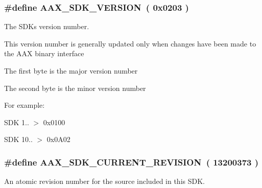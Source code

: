 \subsubsection[{A\+A\+X\+\_\+\+S\+D\+K\+\_\+\+V\+E\+R\+S\+I\+O\+N}]{\setlength{\rightskip}{0pt plus 5cm}\#define A\+A\+X\+\_\+\+S\+D\+K\+\_\+\+V\+E\+R\+S\+I\+O\+N~( 0x0203 )}\label{a00308_aeff268cb7f4d2cc612df086c22b0f1f2}


The S\+D\+K\textquotesingle{}s version number. 

This version number is generally updated only when changes have been made to the A\+A\+X binary interface


\begin{DoxyItemize}
\item The first byte is the major version number
\item The second byte is the minor version number
\end{DoxyItemize}

For example\+:
\begin{DoxyItemize}
\item S\+D\+K 1.. $>$ {\ttfamily 0x0100} 
\item S\+D\+K 10.. $>$ {\ttfamily 0x0\+A02} 
\end{DoxyItemize}\hypertarget{a00308_a7ae13fba5243735a59c3a4dc2554a36f}{}
\subsubsection[{A\+A\+X\+\_\+\+S\+D\+K\+\_\+\+C\+U\+R\+R\+E\+N\+T\+\_\+\+R\+E\+V\+I\+S\+I\+O\+N}]{\setlength{\rightskip}{0pt plus 5cm}\#define A\+A\+X\+\_\+\+S\+D\+K\+\_\+\+C\+U\+R\+R\+E\+N\+T\+\_\+\+R\+E\+V\+I\+S\+I\+O\+N~( 13200373 )}\label{a00308_a7ae13fba5243735a59c3a4dc2554a36f}


An atomic revision number for the source included in this S\+D\+K. 

\hypertarget{a00308_a3f59e1c5a5a7563eeefe64b5781eba93}{}
